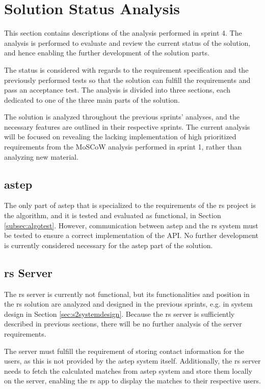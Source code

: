 \section{Solution Status Analysis}
This section contains descriptions of the analysis performed in sprint 4.
The analysis is performed to evaluate and review the current status of the solution, and hence enabling the further development of the solution parts.

The status is considered with regards to the requirement specification and the previously performed tests so that the solution can fulfill the requirements and pass an acceptance test.
The analysis is divided into three sections, each dedicated to one of the three main parts of the solution.

The solution is analyzed throughout the previous sprints' analyses, and the necessary features are outlined in their respective sprints.
The current analysis will be focused on revealing the lacking implementation of high prioritized requirements from the MoSCoW analysis performed in sprint 1, rather than analyzing new material.

\subsection{\gls{astep}}
The only part of \gls{astep} that is specialized to the requirements of the \gls{rs} project is the algorithm, and it is tested and evaluated as functional, in Section \ref{subsec:algotest}. 
However, communication between \gls{astep} and the \gls{rs} system must be tested to ensure a correct implementation of the API.
No further development is currently considered necessary for the \gls{astep} part of the solution.

\subsection{\gls{rs} Server}
The \gls{rs} server is currently not functional, but its functionalities and position in the \gls{rs} solution are analyzed and designed in the previous sprints, e.g. in system design in Section \ref{sec:s2systemdesign}. Because the \gls{rs} server is sufficiently described in previous sections, there will be no further analysis of the server requirements.

The server must fulfill the requirement of storing contact information for the users, as this is not provided by the \gls{astep} system itself.
Additionally, the \gls{rs} server needs to fetch the calculated matches from \gls{astep} system and store them locally on the server, enabling the \gls{rs} app to display the matches to their respective users.


